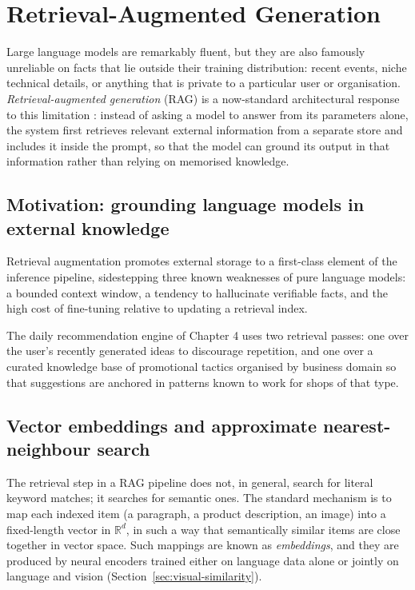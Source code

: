 \section{Retrieval-Augmented Generation}
\label{sec:rag}

Large language models are remarkably fluent, but they are also famously unreliable on facts that lie outside their training distribution: recent events, niche technical details, or anything that is private to a particular user or organisation. \emph{Retrieval-augmented generation} (RAG) is a now-standard architectural response to this limitation \cite{lewis2020rag}: instead of asking a model to answer from its parameters alone, the system first retrieves relevant external information from a separate store and includes it inside the prompt, so that the model can ground its output in that information rather than relying on memorised knowledge.

\subsection{Motivation: grounding language models in external knowledge}

Retrieval augmentation promotes external storage to a first-class element of the inference pipeline, sidestepping three known weaknesses of pure language models: a bounded context window, a tendency to hallucinate verifiable facts, and the high cost of fine-tuning relative to updating a retrieval index.

The daily recommendation engine of Chapter 4 uses two retrieval passes: one over the user's recently generated ideas to discourage repetition, and one over a curated knowledge base of promotional tactics organised by business domain so that suggestions are anchored in patterns known to work for shops of that type.

\subsection{Vector embeddings and approximate nearest-neighbour search}

The retrieval step in a RAG pipeline does not, in general, search for literal keyword matches; it searches for semantic ones. The standard mechanism is to map each indexed item (a paragraph, a product description, an image) into a fixed-length vector in \(\mathbb{R}^d\), in such a way that semantically similar items are close together in vector space. Such mappings are known as \emph{embeddings}, and they are produced by neural encoders trained either on language data alone or jointly on language and vision (Section~\ref{sec:visual-similarity}).

